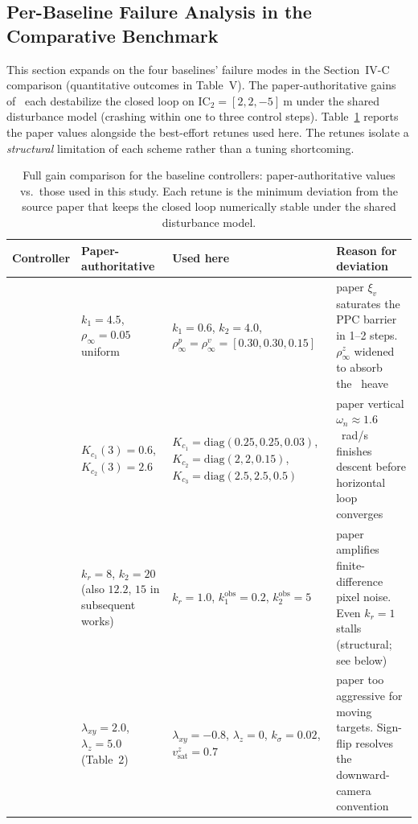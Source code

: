\documentclass[10pt,journal]{IEEEtran}
\begin{document}
\subsection{Per-Baseline Failure Analysis in the Comparative Benchmark}
\label{sec:sup-comparison}

This section expands on the four baselines' failure modes in the Section~IV-C comparison (quantitative outcomes in Table~V). The paper-authoritative gains of~\cite{lin2022,zhang2026,chen2025,cho2022} each destabilize the closed loop on IC$_2=[2,2,-5]~\text{m}$ under the shared disturbance model (crashing within one to three control steps). Table~\ref{baseline gains: table} reports the paper values alongside the best-effort retunes used here. The retunes isolate a \emph{structural} limitation of each scheme rather than a tuning shortcoming.

\begin{table}[!t]
\centering
\footnotesize
\caption{Full gain comparison for the baseline controllers: paper-authoritative values vs.\ those used in this study. Each retune is the minimum deviation from the source paper that keeps the closed loop numerically stable under the shared disturbance model.}
\label{baseline gains: table}
\begin{tabular}{p{} p{} p{} p{}}
\toprule
\textbf{Controller} & \textbf{Paper-authoritative} & \textbf{Used here} & \textbf{Reason for deviation} \\
\midrule
\cite{lin2022} & $k_1{=}4.5$, $\rho_\infty{=}0.05$ uniform & $k_1{=}0.6$, $k_2{=}4.0$, $\rho_\infty^p{=}\rho_\infty^v{=}[0.30,0.30,0.15]$ & paper $\xi_v$ saturates the PPC barrier in 1--2 steps. $\rho_\infty^z$ widened to absorb the~\cite{lin2022} heave \\
\cite{zhang2026} & $K_{c_1}(3){=}0.6$, $K_{c_2}(3){=}2.6$ & $K_{c_1}{=}\text{diag}(0.25,0.25,0.03)$, $K_{c_2}{=}\text{diag}(2,2,0.15)$, $K_{c_3}{=}\text{diag}(2.5,2.5,0.5)$ & paper vertical $\omega_n{\approx}1.6$~rad/s finishes descent before horizontal loop converges \\
\cite{chen2025} & $k_r{=}8$, $k_2{=}20$ (also $12.2$, $15$ in subsequent works) & $k_r{=}1.0$, $k_1^\text{obs}{=}0.2$, $k_2^\text{obs}{=}5$ & paper amplifies finite-difference pixel noise. Even $k_r{=}1$ stalls (structural; see below) \\
\cite{cho2022} & $\lambda_{xy}{=}2.0$, $\lambda_z{=}5.0$ (Table~2) & $\lambda_{xy}{=}{-}0.8$, $\lambda_z{=}0$, $k_\sigma{=}0.02$, $v_\text{sat}^z{=}0.7$ & paper too aggressive for moving targets. Sign-flip resolves the downward-camera convention \\
\bottomrule
\end{tabular}
\end{table}
\end{document}
